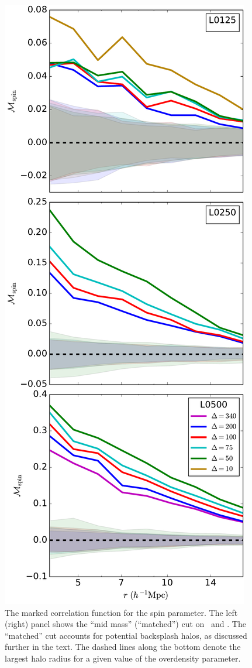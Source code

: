 \documentclass[usenatbib,usegraphicx,letterpaper]{mn2e}
\begin{document}
\begin{figure}
	\centering
	\includegraphics[width=.4\textwidth]{match_mcf_spin.pdf}
	\caption{The marked correlation function for the spin parameter. The left (right) panel shows the ``mid mass'' (``matched'') cut on \simA \ and \simB. The ``matched'' cut accounts for potential backsplash halos, as discussed further in the text. The dashed lines along the bottom denote the largest halo radius for a given value of the overdensity parameter.}
	\label{fig:hvm_mcf_spin}
\end{figure}
\end{document}
